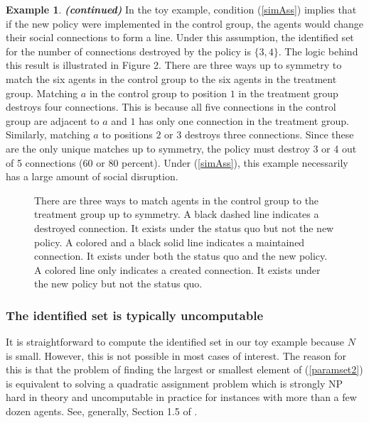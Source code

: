 \documentclass[12pt]{article}
\theoremstyle{definition}
\newtheorem{myexp}{Example}
\newenvironment{myexpcont}
{\addtocounter{myexp}{-1}\begin{myexp}{\textit{\textbf{{(continued)}}}}}
  {\end{myexp}}
\begin{document}
\begin{myexpcont}
In the toy example, condition (\ref{simAss}) implies that if the new policy were implemented in the control group, the agents would change their social connections to form a line. Under this assumption, the identified set for the number of connections destroyed by the policy is $\{3,4\}$. The logic behind this result is illustrated in Figure 2. There are three ways up to symmetry to match the six agents in the control group to the six agents in the treatment group. Matching  $a$ in the control group to position $1$ in the treatment group destroys four connections. This is because all five connections in the control group are adjacent to $a$ and $1$ has only one connection in the treatment group. Similarly, matching $a$ to positions $2$ or $3$ destroys three connections. Since these are the only unique matches up to symmetry, the policy must destroy 3 or 4 out of 5 connections ($60$ or $80$ percent). Under  (\ref{simAss}), this example necessarily has a large amount of social disruption.   
\end{myexpcont}

\begin{figure}
\centering

\vspace{-6mm}
\caption{There are three ways to match agents in the control group to the treatment group up to symmetry. A black dashed line indicates a destroyed connection. It exists under the status quo but not the new policy. A colored and a black solid line indicates a maintained connection. It exists under both the status quo and the new policy. A colored line only indicates a created connection. It exists under the new policy but not the status quo.}
\label{fig:toyexample_matrix}
\end{figure}


\subsubsection{The identified set is typically uncomputable}
It is straightforward to compute the identified set in our toy example because $N$ is small. However, this is not possible in most cases of interest. The reason for this is that the problem of finding the largest or smallest element of (\ref{paramset2}) is equivalent to solving a quadratic assignment problem which is strongly NP hard in theory and uncomputable in practice for instances with more than a few dozen agents. See, generally, Section 1.5 of \cite{cela2013quadratic}.    
\end{document}
